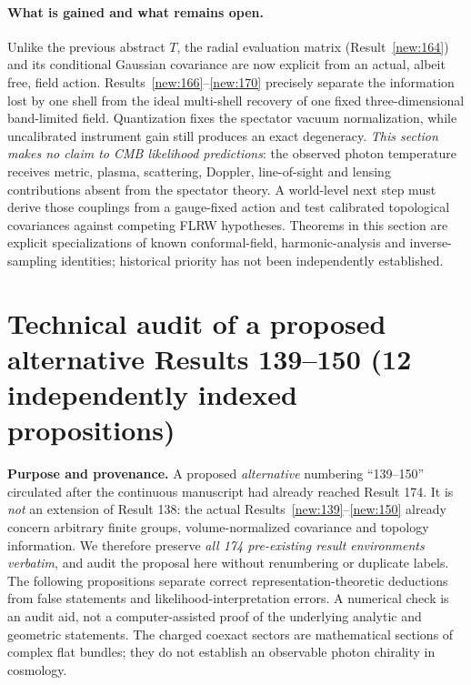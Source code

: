 \documentclass[aps,prd,onecolumn,notitlepage,groupedaddress,11pt]{revtex4-2}
\begin{document}
\paragraph{What is gained and what remains open.}
Unlike the previous abstract $T$, the radial evaluation matrix (Result~\ref{new:164}) and its conditional Gaussian covariance are now explicit from an actual, albeit free, field action. Results~\ref{new:166}--\ref{new:170} precisely separate the information lost by one shell from the ideal multi-shell recovery of one fixed three-dimensional band-limited field. Quantization fixes the spectator vacuum normalization, while uncalibrated instrument gain still produces an exact degeneracy. \emph{This section makes no claim to CMB likelihood predictions}: the observed photon temperature receives metric, plasma, scattering, Doppler, line-of-sight and lensing contributions absent from the spectator theory. A world-level next step must derive those couplings from a gauge-fixed action and test calibrated topological covariances against competing FLRW hypotheses. Theorems in this section are explicit specializations of known conformal-field, harmonic-analysis and inverse-sampling identities; historical priority has not been independently established.

\section{Technical audit of a proposed alternative Results 139--150 (12 independently indexed propositions)}
\label{sec:external-v150-audit}
\noindent\textbf{Purpose and provenance.} A proposed \emph{alternative} numbering ``139--150'' circulated after the continuous manuscript had already reached Result 174. It is \emph{not} an extension of Result 138: the actual Results~\ref{new:139}--\ref{new:150} already concern arbitrary finite groups, volume-normalized covariance and topology information. We therefore preserve \emph{all 174 pre-existing result environments verbatim}, and audit the proposal here without renumbering or duplicate labels. The following propositions separate correct representation-theoretic deductions from false statements and likelihood-interpretation errors. A numerical check is an audit aid, not a computer-assisted proof of the underlying analytic and geometric statements. The charged coexact sectors are mathematical sections of complex flat bundles; they do not establish an observable photon chirality in cosmology.
\end{document}
